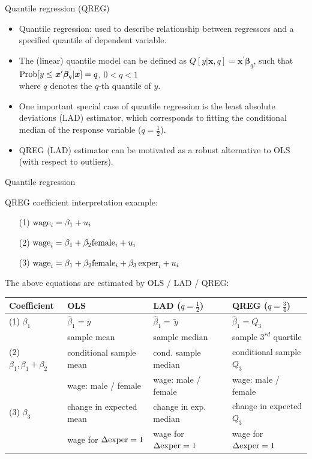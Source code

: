 \documentclass{beamer}
\begin{document}
\begin{frame}{Quantile regression (QREG)}
\begin{itemize}
\item Quantile regression: used to describe relationship between regressors and a specified quantile of dependent variable.
\medskip
\item The (linear) quantile model can be defined as $Q[y|\bm{x}, q]=\bm{x}^{\prime}\bm{\beta}_q$, such that $\textnormal{Prob}[y \le \bm{x}^{\prime}\bm{\beta}_q|\bm{x}]=q$, $0<q<1$ \\where $q$ denotes the $q$-th quantile of $y$.
\medskip
\item One important special case of quantile regression is the least absolute deviations (LAD) estimator, which corresponds to fitting the conditional median of the response variable ($q=\frac{1}{2}$).
\medskip
\item QREG (LAD) estimator can be motivated as a robust  alternative to OLS (with respect to outliers).
\end{itemize}
\end{frame}



\begin{frame}{Quantile regression}

QREG coefficient interpretation example:\\
\bigskip
\begin{itemize}
    \item[(1)] $\textnormal{wage}_i = \beta_1 + u_i$
    \item[(2)] $\textnormal{wage}_i = \beta_1 + \beta_2 \textnormal{female}_i + u_i$
    \item[(3)] $\textnormal{wage}_i = \beta_1 + \beta_2 \textnormal{female}_i + \beta_3 \, \textnormal{exper}_i + u_i$
\end{itemize}
\bigskip
The above equations are estimated by OLS / LAD / QREG:\\
\bigskip
\tiny
\begin{tabular}{|l| l |l |l|}
 \hline
 Coefficient   &     OLS     &   LAD ($q=\tfrac{1}{2}$)   &  QREG ($q=\tfrac{3}{4}$)\\
 \hline 
 (1) $\beta_1$ &   $\hat{\beta}_1=\overline{y}$ & $\hat{\beta}_1=\tilde{\,y\,}$ & $\hat{\beta}_1=Q_3$\\
 & sample mean  & sample median & sample $3^{rd}$ quartile\\
 \hline
 (2) $\beta_1, \beta_1\!+\!\beta_2$ & conditional sample mean & cond. sample median & conditional sample $Q_3$\\
  & wage: male / female & wage: male / female & wage: male / female \\
  \hline
  (3) $\beta_3$ & change in expected mean & change in exp. median & change in expected $Q_3$\\
   & wage for $\Delta\textnormal{exper}=1$ & wage for $\Delta\textnormal{exper}=1$ & wage for $\Delta\textnormal{exper}=1$\\
   \hline
\end{tabular}
\end{frame}
\end{document}
